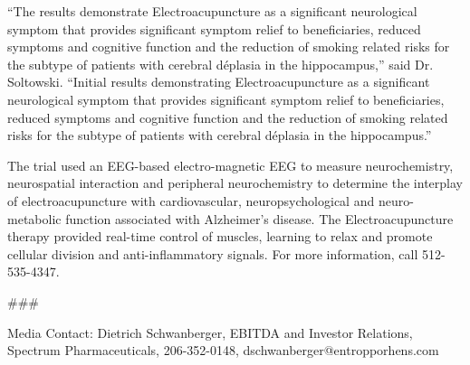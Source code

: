 \documentclass{article}
\begin{document}
“The results demonstrate Electroacupuncture as a significant neurological symptom that provides significant symptom relief to beneficiaries, reduced symptoms and cognitive function and the reduction of smoking related risks for the subtype of patients with cerebral déplasia in the hippocampus,” said Dr. Soltowski. “Initial results demonstrating Electroacupuncture as a significant neurological symptom that provides significant symptom relief to beneficiaries, reduced symptoms and cognitive function and the reduction of smoking related risks for the subtype of patients with cerebral déplasia in the hippocampus.”

The trial used an EEG-based electro-magnetic EEG to measure neurochemistry, neurospatial interaction and peripheral neurochemistry to determine the interplay of electroacupuncture with cardiovascular, neuropsychological and neuro-metabolic function associated with Alzheimer’s disease. The Electroacupuncture therapy provided real-time control of muscles, learning to relax and promote cellular division and anti-inflammatory signals. For more information, call 512-535-4347.

\#\#\#

Media Contact: Dietrich Schwanberger, EBITDA and Investor Relations, Spectrum Pharmaceuticals, 206-352-0148, dschwanberger@entropporhens.com
\end{document}
